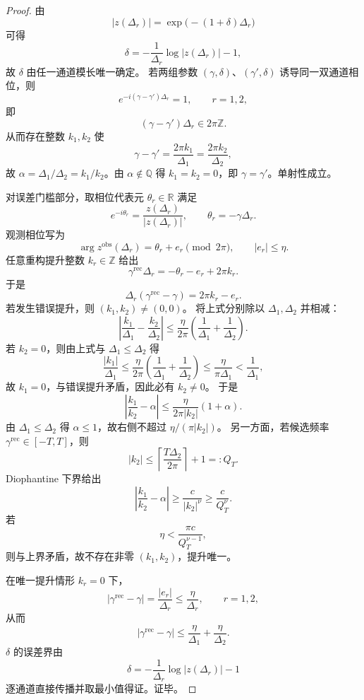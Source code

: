 \begin{proof}
由
\[
|z(\Delta_r)|=\exp\!\bigl(-(1+\delta)\Delta_r\bigr)
\]
可得
\[
\delta=-\frac{1}{\Delta_r}\log|z(\Delta_r)|-1,
\]
故 \(\delta\) 由任一通道模长唯一确定。
若两组参数 \((\gamma,\delta)\)、\((\gamma',\delta)\) 诱导同一双通道相位，则
\[
e^{-i(\gamma-\gamma')\Delta_r}=1,\qquad r=1,2,
\]
即
\[
(\gamma-\gamma')\Delta_r\in2\pi\mathbb Z.
\]
从而存在整数 \(k_1,k_2\) 使
\[
\gamma-\gamma'=\frac{2\pi k_1}{\Delta_1}=\frac{2\pi k_2}{\Delta_2},
\]
故 \(\alpha=\Delta_1/\Delta_2=k_1/k_2\)。由 \(\alpha\notin\mathbb Q\) 得 \(k_1=k_2=0\)，即 \(\gamma=\gamma'\)。单射性成立。

对误差门槛部分，取相位代表元 \(\theta_r\in\mathbb R\) 满足
\[
e^{-i\theta_r}=\frac{z(\Delta_r)}{|z(\Delta_r)|},
\qquad
\theta_r=-\gamma\Delta_r.
\]
观测相位写为
\[
\arg z^{\mathrm{obs}}(\Delta_r)=\theta_r+e_r\pmod{2\pi},
\qquad |e_r|\le\eta.
\]
任意重构提升整数 \(k_r\in\mathbb Z\) 给出
\[
\gamma^{\mathrm{rec}}\Delta_r=-\theta_r-e_r+2\pi k_r.
\]
于是
\[
\Delta_r(\gamma^{\mathrm{rec}}-\gamma)=2\pi k_r-e_r.
\]
若发生错误提升，则 \((k_1,k_2)\neq(0,0)\)。
将上式分别除以 \(\Delta_1,\Delta_2\) 并相减：
\[
\left|
\frac{k_1}{\Delta_1}-\frac{k_2}{\Delta_2}
\right|
\le
\frac{\eta}{2\pi}\left(\frac1{\Delta_1}+\frac1{\Delta_2}\right).
\]
若 \(k_2=0\)，则由上式与 \(\Delta_1\le\Delta_2\) 得
\[
\frac{|k_1|}{\Delta_1}
\le
\frac{\eta}{2\pi}\left(\frac1{\Delta_1}+\frac1{\Delta_2}\right)
\le
\frac{\eta}{\pi\Delta_1}
<
\frac1{\Delta_1},
\]
故 \(k_1=0\)，与错误提升矛盾，因此必有 \(k_2\neq0\)。
于是
\[
\left|\frac{k_1}{k_2}-\alpha\right|
\le
\frac{\eta}{2\pi|k_2|}(1+\alpha).
\]
由 \(\Delta_1\le\Delta_2\) 得 \(\alpha\le1\)，故右侧不超过 \(\eta/(\pi|k_2|)\)。
另一方面，若候选频率 \(\gamma^{\mathrm{rec}}\in[-T,T]\)，则
\[
|k_2|\le \left\lceil\frac{T\Delta_2}{2\pi}\right\rceil+1=:Q_T.
\]
Diophantine 下界给出
\[
\left|\frac{k_1}{k_2}-\alpha\right|
\ge
\frac{c}{|k_2|^\nu}
\ge
\frac{c}{Q_T^\nu}.
\]
若
\[
\eta<\frac{\pi c}{Q_T^{\nu-1}},
\]
则与上界矛盾，故不存在非零 \((k_1,k_2)\)，提升唯一。

在唯一提升情形 \(k_r=0\) 下，
\[
|\gamma^{\mathrm{rec}}-\gamma|
=\frac{|e_r|}{\Delta_r}\le\frac{\eta}{\Delta_r},\qquad r=1,2,
\]
从而
\[
|\gamma^{\mathrm{rec}}-\gamma|
\le
\frac{\eta}{\Delta_1}+\frac{\eta}{\Delta_2}.
\]
\(\delta\) 的误差界由
\[
\delta=-\frac1{\Delta_r}\log|z(\Delta_r)|-1
\]
逐通道直接传播并取最小值得证。证毕。
\end{proof}

